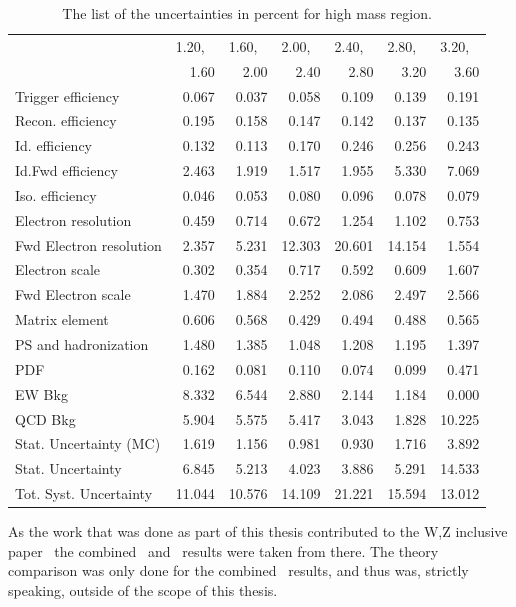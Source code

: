 \begin{table}
\centering
\begin{tabular}{l r r r r r r}
\hline
   & \multicolumn{1}{l}{1.20,} & \multicolumn{1}{l}{1.60,} & \multicolumn{1}{l}{2.00,}
   & \multicolumn{1}{l}{2.40,} & \multicolumn{1}{l}{2.80,} & \multicolumn{1}{l}{3.20,}  \\
   & 1.60  & 2.00  & 2.40  & 2.80  & 3.20  & 3.60  \\
\hline
Trigger efficiency            & 0.067 & 0.037 & 0.058 & 0.109 & 0.139 & 0.191  \\
Recon. efficiency             & 0.195 & 0.158 & 0.147 & 0.142 & 0.137 & 0.135  \\
Id. efficiency                & 0.132 & 0.113 & 0.170 & 0.246 & 0.256 & 0.243  \\
Id.Fwd efficiency             & 2.463 & 1.919 & 1.517 & 1.955 & 5.330 & 7.069  \\
Iso. efficiency               & 0.046 & 0.053 & 0.080 & 0.096 & 0.078 & 0.079  \\
Electron resolution           & 0.459 & 0.714 & 0.672 & 1.254 & 1.102 & 0.753  \\
Fwd Electron resolution       & 2.357 & 5.231 & 12.303 & 20.601 & 14.154 & 1.554  \\
Electron scale                & 0.302 & 0.354 & 0.717 & 0.592 & 0.609 & 1.607  \\
Fwd Electron scale            & 1.470 & 1.884 & 2.252 & 2.086 & 2.497 & 2.566  \\
Matrix element                & 0.606 & 0.568 & 0.429 & 0.494 & 0.488 & 0.565  \\
PS and hadronization          & 1.480 & 1.385 & 1.048 & 1.208 & 1.195 & 1.397  \\
PDF                           & 0.162 & 0.081 & 0.110 & 0.074 & 0.099 & 0.471  \\
EW Bkg                        & 8.332 & 6.544 & 2.880 & 2.144 & 1.184 & 0.000  \\
QCD Bkg                       & 5.904 & 5.575 & 5.417 & 3.043 & 1.828 & 10.225  \\
\hline
Stat. Uncertainty (MC)        & 1.619 & 1.156 & 0.981 & 0.930 & 1.716 & 3.892  \\
Stat. Uncertainty             & 6.845 & 5.213 & 4.023 & 3.886 & 5.291 & 14.533  \\
\hline
Tot. Syst. Uncertainty        & 11.044 & 10.576 & 14.109 & 21.221 & 15.594 & 13.012 \\
\hline
\end{tabular}
\caption{The list of the uncertainties in percent for high mass region.}
\label{tab:Zee_unc_list_high}
\end{table}
As the work that was done as part of this thesis contributed to the W,Z inclusive paper~\cite{lib:wz2011} the combined \Zee\ and \Zll\ results were taken from there. The theory comparison was only done for the combined \Zll\ results, and thus was, strictly speaking, outside of the scope of this thesis.

